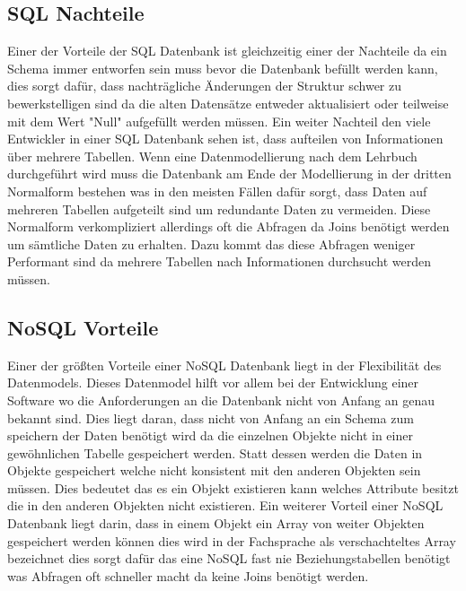 	\subsection{SQL Nachteile}
		Einer der Vorteile der SQL Datenbank ist gleichzeitig einer der Nachteile da ein Schema immer entworfen sein muss bevor die Datenbank befüllt werden kann, dies sorgt dafür, dass nachträgliche Änderungen der Struktur schwer zu bewerkstelligen sind da die alten Datensätze entweder aktualisiert oder teilweise mit dem Wert "Null" aufgefüllt werden müssen. Ein weiter Nachteil den viele Entwickler in einer SQL Datenbank sehen ist, dass aufteilen von Informationen über mehrere Tabellen. Wenn eine Datenmodellierung nach dem Lehrbuch durchgeführt wird muss die Datenbank am Ende der Modellierung in der dritten Normalform bestehen was in den meisten Fällen dafür sorgt, dass Daten auf mehreren Tabellen aufgeteilt sind um redundante Daten zu vermeiden. Diese Normalform verkompliziert allerdings oft die Abfragen da Joins benötigt werden um sämtliche Daten zu erhalten. Dazu kommt das diese Abfragen weniger Performant sind da mehrere Tabellen nach Informationen durchsucht werden müssen. 
		
	\subsection{NoSQL Vorteile}
		Einer der größten Vorteile einer NoSQL Datenbank liegt in der Flexibilität des Datenmodels. Dieses Datenmodel hilft vor allem bei der Entwicklung einer Software wo die Anforderungen an die Datenbank nicht von Anfang an genau bekannt sind. Dies liegt daran, dass nicht von Anfang an ein Schema zum speichern der Daten benötigt wird da die einzelnen Objekte nicht in einer gewöhnlichen Tabelle gespeichert werden. Statt dessen werden die Daten in Objekte gespeichert welche nicht konsistent mit den anderen Objekten sein müssen. Dies bedeutet das es ein Objekt existieren kann welches Attribute besitzt die in den anderen Objekten nicht existieren. Ein weiterer Vorteil einer NoSQL Datenbank liegt darin, dass in einem Objekt ein Array von weiter Objekten gespeichert werden können dies wird in der Fachsprache als verschachteltes Array bezeichnet dies sorgt dafür das eine NoSQL fast nie Beziehungstabellen benötigt was Abfragen oft schneller macht da keine Joins benötigt werden. 
	
